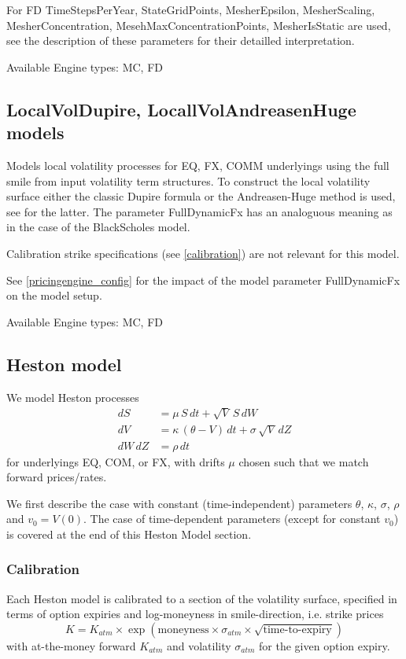 For FD TimeStepsPerYear, StateGridPoints, MesherEpsilon, MesherScaling, MesherConcentration,
MesehMaxConcentrationPoints, MesherIsStatic are used, see the description of these parameters for their detailled
interpretation.

\smallskip
Available Engine types: MC, FD

\subsection{LocalVolDupire, LocallVolAndreasenHuge models}

Models local volatility processes for EQ, FX, COMM underlyings using the full smile from input volatility term
structures. To construct the local volatility surface either the classic Dupire formula or the Andreasen-Huge method is
used, see \cite{andreasen_huge_localvol} for the latter. The parameter FullDynamicFx has an analoguous meaning as in the
case of the BlackScholes model.

Calibration strike specifications (see \ref{calibration}) are not relevant for this model.

See \ref{pricingengine_config} for the impact of the model parameter FullDynamicFx on the model setup.

\smallskip
Available Engine types: MC, FD

\subsection{Heston model}

We model Heston processes
\begin{align*}
dS &= \mu\,S\,dt + \sqrt{V}\,S\,dW \\
dV &= \kappa\,(\theta - V)\,dt + \sigma\,\sqrt{V}\,dZ \\
dW\,dZ &= \rho\,dt
\end{align*}
for underlyings EQ, COM, or FX, with drifts $\mu$ chosen such that we match forward prices/rates.

We first describe the case with constant (time-independent) parameters $\theta$, $\kappa$, $\sigma$,
$\rho$ and $v_0=V(0)$. The case of time-dependent parameters (except for constant $v_0$) is covered at
the end of this Heston Model section.

\subsubsection*{Calibration}

Each Heston model is calibrated to a section of the vo\-la\-ti\-lity surface,
specified in terms of option expiries and log-moneyness in smile-direction, i.e. strike prices 
$$
K = K_{atm} \times \exp\left(\mbox{moneyness}\times\sigma_{atm}\times\sqrt{\mbox{time-to-expiry}}\right)
$$
with at-the-money forward $K_{atm}$ and volatility $\sigma_{atm}$ for the given option expiry.

